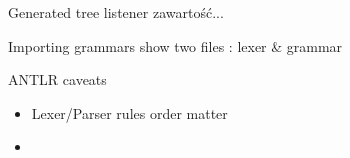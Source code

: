 \documentclass{beamer}
\begin{document}
\begin{frame}{Generated tree listener}
	zawartość...
\end{frame}

\begin{frame}{Importing grammars}
	show two files : lexer \& grammar
\end{frame}

\begin{frame}{ANTLR caveats}
	\begin{itemize}
		\item Lexer/Parser rules order matter
		\item 
	\end{itemize}
\end{frame}

\end{document}
